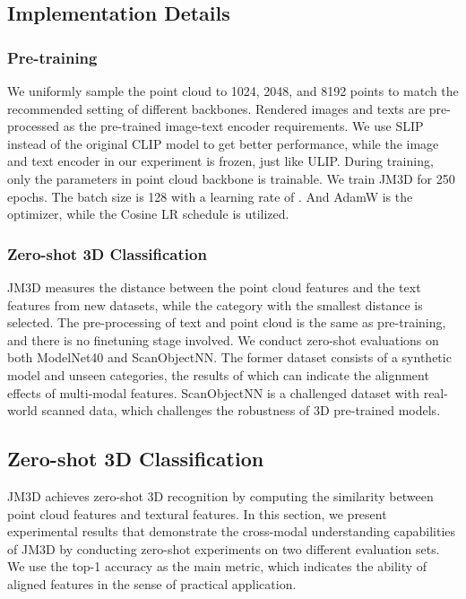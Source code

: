 \documentclass[sigconf]{acmart}
\begin{document}
\subsection{Implementation Details}
\subsubsection{\textbf{Pre-training}}

We uniformly sample the point cloud to 1024, 2048, and 8192 points to match the recommended setting of different backbones. Rendered images and texts are pre-processed as the pre-trained image-text encoder requirements. We use SLIP~\cite{mu2022slip} instead of the original CLIP model to get better performance, while the image and text encoder in our experiment is frozen, just like ULIP. During training, only the parameters in point cloud backbone is trainable. We train JM3D for 250 epochs. The batch size is 128 with a learning rate of . And AdamW is the optimizer, while the Cosine LR schedule is utilized.

\subsubsection{\textbf{Zero-shot 3D Classification}}

JM3D measures the distance between the point cloud features and the text features from new datasets, while the category with the smallest distance is selected. The pre-processing of text and point cloud is the same as pre-training, and there is no finetuning stage involved. We conduct zero-shot evaluations on both ModelNet40 and ScanObjectNN. The former dataset consists of a synthetic model and unseen categories, the results of which can indicate the alignment effects of multi-modal features. ScanObjectNN is a challenged dataset with real-world scanned data, which challenges the robustness of 3D pre-trained models.





\subsection{Zero-shot 3D Classification}



JM3D achieves zero-shot 3D recognition by computing the similarity between point cloud features and textural features. In this section, we present experimental results that demonstrate the cross-modal understanding capabilities of JM3D by conducting zero-shot experiments on two different evaluation sets. We use the top-1 accuracy as the main metric, which indicates the ability of aligned features in the sense of practical application. 
\end{document}
